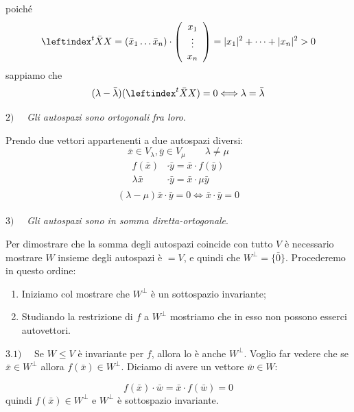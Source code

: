 \documentclass[x11names]{article}
\begin{document}
\begin{es}{}
poiché
\[
\leftindex^{t}{\bar{X}} X = (\bar{x}_{1} \dots \bar{x}_{n}) \cdot \left(\begin{array}{c}
	x_{1} \\ \vdots \\ x_{n}
\end{array}\right)
= |x_{1}|^2 + \dots + |x_{n}|^2 > 0
\]
sappiamo che 
\[
(\lambda - \bar{\lambda})(\leftindex^{t}{\bar{X}} X) = 0 \Longleftrightarrow \lambda = \bar{\lambda}
\]

$2) \quad$ \textit{Gli autospazi sono ortogonali fra loro}.

Prendo due vettori appartenenti a due autospazi diversi:
\[
\bar{x} \in V_{\lambda}, \bar{y} \in V_{\mu} \qquad \lambda \neq \mu
\]
\begin{align*}
	f(\bar{x})& \cdot \bar{y} = \bar{x}\cdot f(\bar{y}) \\
	\lambda \bar{x}& \cdot \bar{y} = \bar{x} \cdot \mu \bar{y} \\
\end{align*}
\[
(\lambda - \mu)\bar{x} \cdot \bar{y} = 0 \Longleftrightarrow \bar{x} \cdot \bar{y} = 0
\]
\\

$3) \quad$ \textit{Gli autospazi sono in somma diretta-ortogonale}.

Per dimostrare che la somma degli autospazi coincide con tutto $V$ è necessario mostrare $W$ insieme degli autospazi è $ = V$, e quindi che $W^\perp = \{\bar{0}\}$. Procederemo in questo ordine:
\begin{enumerate}
	\item Iniziamo col mostrare che $W^\perp$ è un sottospazio invariante;
	\item Studiando la restrizione di $f$ a $W^\perp$ mostriamo che in esso non possono esserci autovettori.
\end{enumerate}

$3.1) \quad$ Se $W \leq V$ è invariante per $f$, allora lo è anche $W^\perp$. Voglio far vedere che se $\bar{x} \in W^\perp$ allora $f(\bar{x})  \in W^\perp$. Diciamo di avere un vettore $\bar{w} \in W$:

\[
f(\bar{x}) \cdot \bar{w} = \bar{x} \cdot f(\bar{w})  = 0
\]
quindi $f(\bar{x}) \in W^\perp$ e $W^\perp$ è sottospazio invariante. \\ \\


\end{es}
\end{document}
